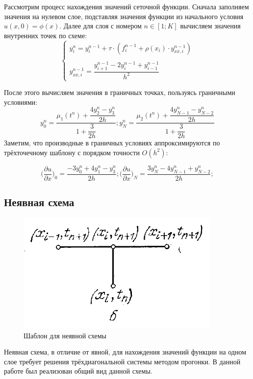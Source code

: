 \documentclass[12pt]{article}
\begin{document}
Рассмотрим процесс нахождения значений сеточной функции. Сначала заполняем значения на нулевом слое, подставляя значения функции из начального условия $u(x, 0) = \phi(x)$. Далее для слоя с номером $n \in [1; K]$ вычисляем значения внутренних точек по схеме:
$$
\begin{cases}
y_i^n = y_i^{n-1} + \tau\cdot (f_i^{n-1} + \rho(x_i)\cdot y_{x\overline{x}, i}^{n-1}) \\ \\ 
y_{x\overline{x}, i}^{n-1} = \dfrac{y_{i+1}^{n-1} - 2y_i^{n-1} + y_{i-1}^{n-1}}{h^2}
\end{cases}
$$

После этого вычисляем значения в граничных точках, пользуясь граничными условиями:
$$
y_0^n = \dfrac{\mu_1(t^n) + \dfrac{4y_2^n - y_3^n}{2h}}{1 + \dfrac{3}{2h}} ; y_N^n = \dfrac{\mu_2(t^n) + \dfrac{4y_{N-1}^n - y_{N-2}^n}{2h}}{1 + \dfrac{3}{2h}} 
$$
Заметим, что производные в граничных условиях аппроксимируются по трёхточечному шаблону с порядком точности $O(h^2)$:

$$
\bigg( \dfrac{\partial u}{\partial x} \bigg)_0 = \dfrac{-3y_0^n + 4y_1^n - y_3^n}{2h}; 
\bigg( \dfrac{\partial u}{\partial x} \bigg)_N = \dfrac{3y_N^n - 4y_{N-1}^n + y_{N-2}^n}{2h}; 
$$

\newpage

\subsection{Неявная схема}

\begin{figure}[h]
\begin{center}
\includegraphics[scale = 0.8]{imp.png} 
\end{center}
\caption{Шаблон для неявной схемы}
\end{figure}

Неявная схема, в отличие от явной, для нахождения значений функции на одном слое требует решения трёхдиагональной системы методом прогонки.
В данной работе был реализован общий вид данной схемы.
\end{document}
